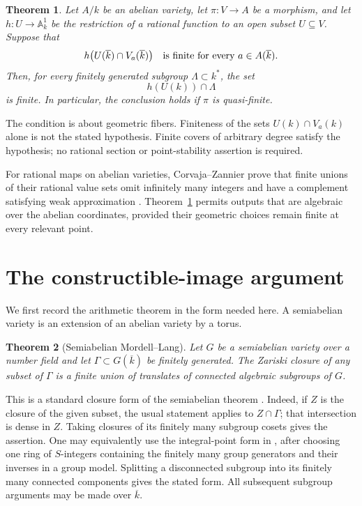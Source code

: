 \documentclass[11pt,a4paper]{article}
\newtheorem{theorem}{Theorem}[section]
\theoremstyle{definition}
\newcommand{\A}{\mathbb A}\newcommand{\PP}{\mathbb P}
\begin{document}
\begin{theorem}\label{thm:main}
Let $A/k$ be an abelian variety, let $\pi:V\to A$ be a morphism,
and let $h:U\to\A^1_k$ be the restriction of a rational function
to an open subset $U\subseteq V$. Suppose that
\begin{equation}\label{eq:finite-values}
       h\bigl(U(\overline k)\cap V_a(\overline k)\bigr)
       \quad\hbox{is finite for every }a\in A(\overline k).
\end{equation}
Then, for every finitely generated subgroup $\Lambda\subset k^*$,
the set
\[
                         h(U(k))\cap\Lambda
\]
is finite. In particular, the conclusion holds if $\pi$ is
quasi-finite.
\end{theorem}

The condition is about geometric fibers. Finiteness of the sets
$U(k)\cap V_a(k)$ alone is not the stated hypothesis. Finite covers
of arbitrary degree satisfy the hypothesis; no rational section or
point-stability assertion is required.

For rational maps on abelian varieties, Corvaja--Zannier prove that
finite unions of their rational value sets omit infinitely many
integers and have a complement satisfying weak approximation
\cite[Theorems 1.1 and 1.10]{CZ}. Theorem~\ref{thm:main} permits
outputs that are algebraic over the abelian coordinates, provided
their geometric choices remain finite at every relevant point.

\section{The constructible-image argument}

We first record the arithmetic theorem in the form needed here.
A semiabelian variety is an extension of an abelian variety by a
torus.

\begin{theorem}[Semiabelian Mordell--Lang]\label{thm:ML}
Let $G$ be a semiabelian variety over a number field and let
$\Gamma\subset G(\overline k)$ be finitely generated. The Zariski
closure of any subset of $\Gamma$ is a finite union of translates
of connected algebraic subgroups of $G$.
\end{theorem}

This is a standard closure form of the semiabelian theorem
\cite{VojtaI,VojtaSurvey}. Indeed, if $Z$ is the closure of the
given subset, the usual statement applies to $Z\cap\Gamma$;
that intersection is dense in $Z$. Taking closures of its finitely
many subgroup cosets gives the assertion. One may equivalently use
the integral-point form in \cite[Theorem 2.2]{VojtaSurvey}, after
choosing one ring of $S$-integers containing the finitely many group
generators and their inverses in a group model. Splitting a
disconnected subgroup into its finitely many connected components
gives the stated form. All subsequent subgroup arguments may be
made over $\overline k$.
\end{document}
